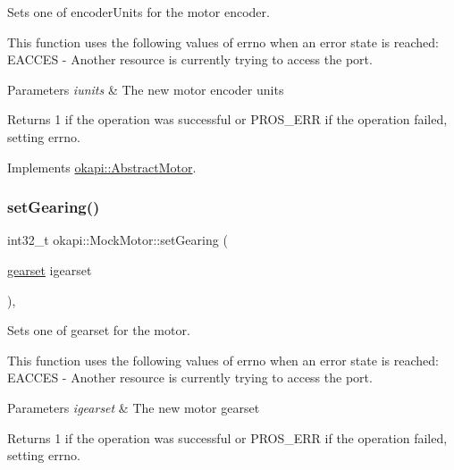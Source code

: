 Sets one of encoder\+Units for the motor encoder. 

This function uses the following values of errno when an error state is reached\+: E\+A\+C\+C\+ES -\/ Another resource is currently trying to access the port.


\begin{DoxyParams}{Parameters}
{\em iunits} & The new motor encoder units \\
\hline
\end{DoxyParams}
\begin{DoxyReturn}{Returns}
1 if the operation was successful or P\+R\+O\+S\+\_\+\+E\+RR if the operation failed, setting errno. 
\end{DoxyReturn}


Implements \mbox{\hyperlink{classokapi_1_1AbstractMotor_aae559b72399b0eb2124d969e40f97415}{okapi\+::\+Abstract\+Motor}}.

\mbox{\label{classokapi_1_1MockMotor_a4e9c94656f43b69c489deeb82908e817}} 
\subsubsection{\texorpdfstring{setGearing()}{setGearing()}}
{\footnotesize\ttfamily int32\+\_\+t okapi\+::\+Mock\+Motor\+::set\+Gearing (\begin{DoxyParamCaption}\item[{\mbox{\hyperlink{classokapi_1_1AbstractMotor_a88aaa6ea2fa10f5520a537bbf26774d5}{gearset}}}]{igearset }\end{DoxyParamCaption})\hspace{0.3cm}{\ttfamily [override]}, {\ttfamily [virtual]}}



Sets one of gearset for the motor. 

This function uses the following values of errno when an error state is reached\+: E\+A\+C\+C\+ES -\/ Another resource is currently trying to access the port.


\begin{DoxyParams}{Parameters}
{\em igearset} & The new motor gearset \\
\hline
\end{DoxyParams}
\begin{DoxyReturn}{Returns}
1 if the operation was successful or P\+R\+O\+S\+\_\+\+E\+RR if the operation failed, setting errno. 
\end{DoxyReturn}


